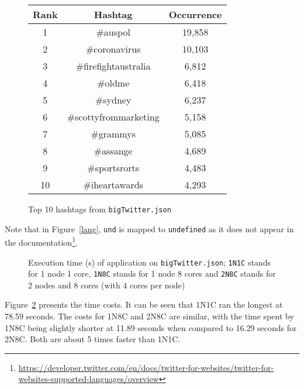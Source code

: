 \documentclass[10pt]{article}
\begin{document}
\begin{figure}[H]
\begin{center}
\begin{tabular}{ |c|c|c|}
 \hline
 Rank& Hashtag &Occurrence\\
 \hline
1&\#auspol&19,858\\
2&\#coronavirus&10,103\\
3&\#firefightaustralia&6,812\\
4&\#oldme&6,418\\
5&\#sydney&6,237\\
6&\#scottyfrommarketing&5,158\\
7&\#grammys&5,085\\
8&\#assange&4,689\\
9&\#sportsrorts&4,483\\
10&\#iheartawards&4,293 \\
 \hline
\end{tabular}
    \caption{Top 10 hashtags from \texttt{bigTwitter.json}\label{hashtag}}
    \label{hash}
\end{center}
\end{figure}

Note that in Figure~\ref{lang}, \texttt{und} is mapped to \texttt{undefined} as it does not appear in the documentation\footnote{\url{https://developer.twitter.com/en/docs/twitter-for-websites/twitter-for-websites-supported-languages/overview}}.

\begin{figure}
\begin{center}
\end{center}
\caption{Execution time (s) of application on \texttt{bigTwitter.json}; \texttt{1N1C} stands for 1 node 1 core, \texttt{1N8C} stands for 1 node 8 cores and \texttt{2N8C} stands for 2 nodes and 8 cores (with 4 cores per node)}
\label{exe}
\end{figure}

Figure~\ref{exe} presents the time costs. 
It can be seen that 1N1C ran the longest at 78.59 seconds. 
The costs for 1N8C and 2N8C are similar, with the time spent by 1N8C being slightly shorter at 11.89 seconds when compared to 16.29 seconds for 2N8C. 
Both are about 5 times faster than 1N1C.
\end{document}
